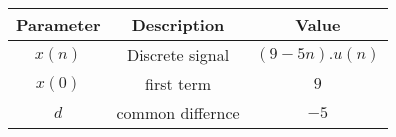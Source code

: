 \begin{tabular}{|c|c|c|}
\hline
     \textbf{Parameter} & \textbf{Description} & \textbf{Value} \\
     \hline
     $x(n)$ & Discrete signal & $(9 -5n).u(n)$\\
     \hline
     $x(0)$ & first term & $9$\\
     \hline
     $d$ & common differnce & $-5$ \\
     \hline
\end{tabular}
